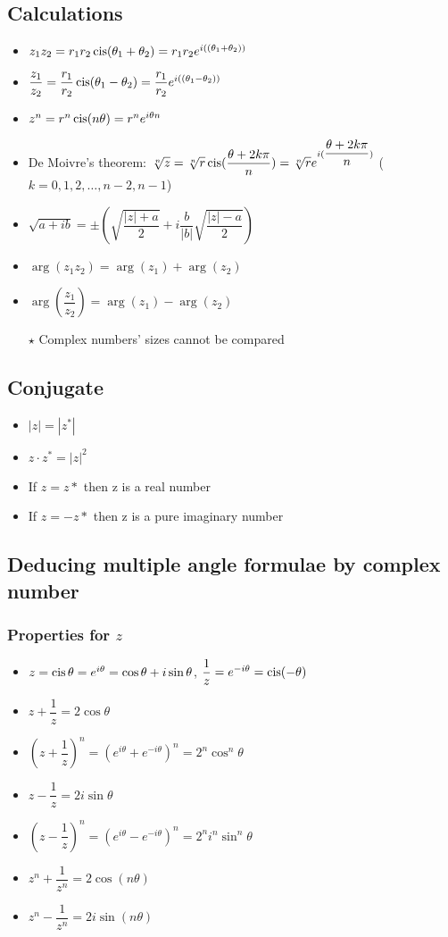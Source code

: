 \subsection{Calculations}
\begin{itemize}
	\item $z_1z_2=r_1r_2\operatorname{cis}(\theta_1+\theta_2)=r_1r_2e^{i((\theta_1+\theta_2))}$
	\item $\dfrac{z_1}{z_2}=\dfrac{r_1}{r_2}\operatorname{cis}(\theta_1-\theta_2)=\dfrac{r_1}{r_2}e^{i((\theta_1-\theta_2))}$
	\item $z^n = r^n\operatorname{cis}(n\theta)=r^ne^{i\theta n}$
	\item De Moivre's theorem: $\sqrt[n]{z}=\sqrt[n]{r}\operatorname{cis}(\dfrac{\theta+2k\pi}{n})=\sqrt[n]{r}e^{i(\dfrac{\theta+2k\pi}{n})}$ ($k=0,1,2,\dots,n-2,n-1$)
	\item $\sqrt{a+ib}=\pm(\sqrt{\dfrac{|z|+a}{2}}+i\dfrac{b}{|b|}\sqrt{\dfrac{|z|-a}{2}})$
	\item $\arg(z_1z_2)=\arg(z_1)+\arg(z_2)$
	\item $\arg(\dfrac{z_1}{z_2})=\arg(z_1)-\arg(z_2)$
	\item[$\star$] Complex numbers' sizes cannot be compared
\end{itemize}


\subsection{Conjugate}
\begin{itemize}
	\item $|z|=|z^*|$
	\item $z\cdot z^*= |z|^2$
	\item If $z=z*$ then z is a real number
	\item If $z=-z*$ then z is a pure imaginary number
\end{itemize}

\subsection{Deducing multiple angle formulae by complex number}
\subsubsection{Properties for $z$}
\begin{itemize}
	\item $z=\operatorname{cis}\theta=e^{i\theta}=\cos\theta + i\sin\theta$, $\dfrac{1}{z} = e^{-i\theta} = \operatorname{cis} (-\theta)$
	\item $z+\dfrac{1}{z}=2\cos\theta$
	\item $(z+\dfrac{1}{z})^n=(e^{i\theta}+e^{-i\theta})^n=2^n\cos^n\theta$
	\item $z-\dfrac{1}{z}=2i\sin\theta$
	\item $(z-\dfrac{1}{z})^n=(e^{i\theta}-e^{-i\theta})^n=2^n i^n \sin^n\theta$
	\item $z^n+\dfrac{1}{z^n}=2\cos (n\theta)$
	\item $z^n-\dfrac{1}{z^n}=2i\sin (n\theta)$
\end{itemize}
